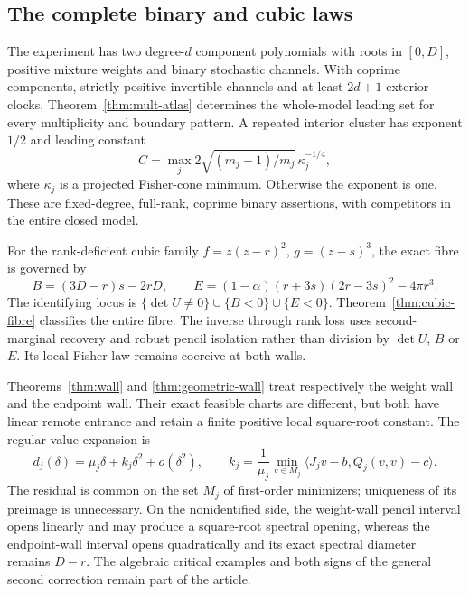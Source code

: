 \subsection*{The complete binary and cubic laws}
The experiment has two degree-$d$ component polynomials with roots in
$[0,D]$, positive mixture weights and binary stochastic channels. With
coprime components, strictly positive invertible channels and at least
$2d+1$ exterior clocks, Theorem~\ref{thm:mult-atlas} determines the
whole-model leading set for every multiplicity and boundary pattern.
A repeated interior cluster has exponent $1/2$ and leading constant
\[
 C=\max_j2\sqrt{(m_j-1)/m_j}\,\kappa_j^{-1/4},
\]
where $\kappa_j$ is a projected Fisher-cone minimum. Otherwise the
exponent is one. These are fixed-degree, full-rank, coprime binary
assertions, with competitors in the entire closed model.

For the rank-deficient cubic family
$f=z(z-r)^2$, $g=(z-s)^3$, the exact fibre is governed by
\[
 B=(3D-r)s-2rD,\qquad
 E=(1-\alpha)(r+3s)(2r-3s)^2-4\pi r^3.
\]
The identifying locus is
$\{\det U\ne0\}\cup\{B<0\}\cup\{E<0\}$.
Theorem~\ref{thm:cubic-fibre} classifies the entire fibre. The inverse
through rank loss uses second-marginal recovery and robust pencil
isolation rather than division by $\det U$, $B$ or $E$.
Its local Fisher law remains coercive at both walls.

Theorems~\ref{thm:wall} and \ref{thm:geometric-wall} treat respectively
the weight wall and the endpoint wall. Their exact feasible charts are
different, but both have linear remote entrance and retain a finite
positive local square-root constant. The regular value expansion is
\[
 d_j(\delta)=\mu_j\delta+k_j\delta^2+o(\delta^2),\qquad
 k_j=\frac1{\mu_j}\min_{v\in M_j}
       \langle J_jv-b,Q_j(v,v)-c\rangle.
\]
The residual is common on the set $M_j$ of first-order minimizers;
uniqueness of its preimage is unnecessary. On the nonidentified side,
the weight-wall pencil interval opens linearly and may produce a
square-root spectral opening, whereas the endpoint-wall interval opens
quadratically and its exact spectral diameter remains $D-r$.
The algebraic critical examples and both signs of the general second
correction remain part of the article.

